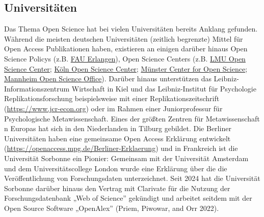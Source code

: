 \documentclass[
  letterpaper,
  DIV=11,
  numbers=noendperiod]{scrreprt}
\begin{document}
\subsection{Universitäten}\label{universituxe4ten}

\begin{tcolorbox}[enhanced jigsaw, title=\textcolor{quarto-callout-note-color}{\faInfo}\hspace{0.5em}{Welche Universitäten tun etwas? (Beispiele)}, colbacktitle=quarto-callout-note-color!10!white, rightrule=.15mm, titlerule=0mm, left=2mm, bottomrule=.15mm, arc=.35mm, leftrule=.75mm, toprule=.15mm, opacityback=0, breakable, bottomtitle=1mm, colframe=quarto-callout-note-color-frame, toptitle=1mm, opacitybacktitle=0.6, coltitle=black, colback=white]

Das Thema Open Science hat bei vielen Universitäten bereits Anklang
gefunden. Während die meisten deutschen Universitäten (zeitlich
begrenzte) Mittel für Open Access Publikationen haben, existieren an
einigen darüber hinaus Open Science Policys (z.B.
\href{https://oa-info.sh/2022/01/open-science-policy-der-uni-erlangen-nuernberg/}{FAU
Erlangen}), Open Science Centers (z.B.
\href{https://www.osc.uni-muenchen.de/index.html}{LMU Open Science
Center}; \href{https://oscc.uni-koeln.de/home}{Köln Open Science
Center}; \href{https://www.uni-muenster.de/MueCOS/}{Münster Center for
Open Science};
\href{https://www.uni-mannheim.de/open-science/open-science-office/}{Mannheim
Open Science Office}). Darüber hinaus unterstützen das
Leibniz-Informationszentrum Wirtschaft in Kiel und das Leibniz-Institut
für Psychologie Replikationsforschung beispielsweise mit einer
Replikationszeitschrift (\url{https://www.jcr-econ.org}) oder im Rahmen
einer Juniorprofessur für Psychologische Metawissenschaft. Eines der
größten Zentren für Metawissenschaft n Europas hat sich in den
Niederlanden in Tilburg gebildet. Die Berliner Universitäten haben eine
gemeinsame Open Access Erklärung entwickelt
(\url{https://openaccess.mpg.de/Berliner-Erklaerung}) und in Frankreich
ist die Universität Sorbonne ein Pionier: Gemeinsam mit der Universität
Amsterdam und dem Universitätscollege London wurde eine Erklärung über
die die Veröffentlichung von Forschungsdaten unterzeichnet. Seit 2024
hat die Universität Sorbonne darüber hinaus den Vertrag mit Clarivate
für die Nutzung der Forschungsdatenbank „Web of Science'' gekündigt und
arbeitet seitdem mit der Open Source Software „OpenAlex'' (Priem,
Piwowar, and Orr 2022).

\end{tcolorbox}
\end{document}
